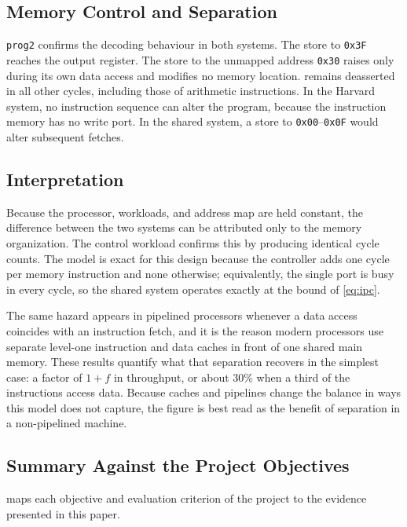 \documentclass[conference]{IEEEtran}
\newcommand{\sig}[1]{\texttt{\detokenize{#1}}}
\begin{document}
\subsection{Memory Control and Separation}
\texttt{prog2} confirms the decoding behaviour in both systems. The store to \texttt{0x3F} reaches the
output register. The store to the unmapped address \texttt{0x30} raises \sig{addr_err} only during its
own data access and modifies no memory location. \sig{addr_err} remains deasserted in all other
cycles, including those of arithmetic instructions. In the Harvard system, no instruction sequence can
alter the program, because the instruction memory has no write port. In the shared system, a store to
\texttt{0x00}--\texttt{0x0F} would alter subsequent fetches.

\subsection{Interpretation}
Because the processor, workloads, and address map are held constant, the difference between the two
systems can be attributed only to the memory organization. The control workload confirms this by
producing identical cycle counts. The model is exact for this design because the controller adds
one cycle per memory instruction and none otherwise; equivalently, the single port is busy in every
cycle, so the shared system operates exactly at the bound of \eqref{eq:ipc}.

The same hazard appears in pipelined processors whenever a data access coincides with an
instruction fetch, and it is the reason modern processors use separate level-one instruction and
data caches in front of one shared main memory. These results quantify what that separation
recovers in the simplest case: a factor of $1+f$ in throughput, or about 30\% when a third of the
instructions access data. Because caches and pipelines change the balance in ways this model does
not capture, the figure is best read as the benefit of separation in a non-pipelined machine.

\subsection{Summary Against the Project Objectives}
 maps each objective and evaluation criterion of the project to the evidence
presented in this paper.
\end{document}
